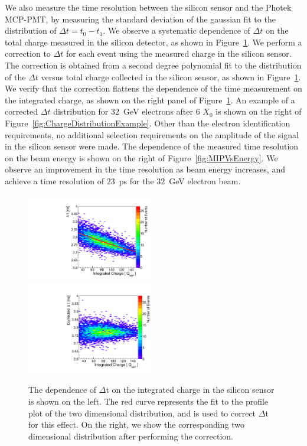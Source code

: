 \documentclass[12pt]{article}
\begin{document}
{We also measure the time resolution between the silicon sensor and the Photek
MCP-PMT, by measuring the standard deviation of the gaussian fit to the
distribution of $\Delta t = t_0-t_1$. We observe a systematic dependence of
$\Delta t$ on the total charge measured in the silicon detector, as shown in
Figure~\ref{fig:timewalk}. We perform a correction to $\Delta t$ for each event
using the measured charge in the silicon sensor. The correction is obtained from
a second degree polynomial fit to the distribution of the $\Delta t$ versus
total charge collected in the silicon sensor, as shown in
Figure~\ref{fig:timewalk}. We verify that the correction flattens the dependence
of the time measurement on the integrated charge, as shown on the right panel of
Figure~\ref{fig:timewalk}. An example of a corrected $\Delta t$ distribution for
$32$~GeV electrons after 6 $X_0$ is shown on the right of
Figure~\ref{fig:ChargeDistributionExample}. Other than the electron identification
requirements, no additional selection requirements on the amplitude of the
signal in the silicon sensor were made. The dependence of the measured time
resolution on the beam energy is shown on the right of
Figure~\ref{fig:MIPVsEnergy}. We observe an improvement in the time resolution
as beam energy increases, and achieve a time resolution of $23$~ps for the
$32$~GeV electron beam.

\begin{figure}[htbp] 
\centering
\includegraphics[width=0.49\textwidth]{plots/DeltaT_vs_Charge_Uncorrected.pdf} 
\includegraphics[width=0.5\textwidth]{plots/DeltaT_vs_Charge_Corrected.pdf} 
\caption{ The dependence of $\Delta$t on the integrated charge in the 
silicon sensor is shown on the left. The red curve represents the fit to the
profile plot of the two dimensional distribution, and is used to correct
$\Delta$t for this effect. On the right, we show the corresponding two dimensional
distribution after performing the correction.
} 
\label{fig:timewalk} 
\end{figure} 

}
\end{document}
